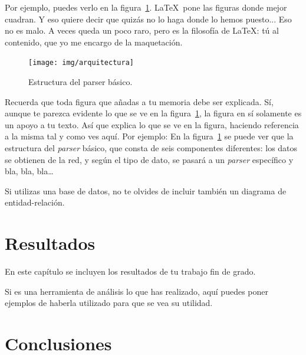 \documentclass[a4paper, 12pt]{book}
\begin{document}
Por ejemplo, puedes verlo en la figura~\ref{fig:arquitectura}.
\LaTeX \ pone las figuras donde mejor cuadran. 
Y eso quiere decir que quizás no lo haga donde lo hemos puesto...
Eso no es malo.
A veces queda un poco raro, pero es la filosofía de \LaTeX: tú al contenido, que yo me encargo de la maquetación.

\begin{figure}
  \centering
  \texttt{[image: img/arquitectura]}
  \caption{Estructura del parser básico.}
  \label{fig:arquitectura}
\end{figure}

Recuerda que toda figura que añadas a tu memoria debe ser explicada.
Sí, aunque te parezca evidente lo que se ve en la figura~\ref{fig:arquitectura}, la figura en sí solamente es un apoyo a tu texto.
Así que explica lo que se ve en la figura, haciendo referencia a la misma tal y como ves aquí.
Por ejemplo: En la figura~\ref{fig:arquitectura} se puede ver que la estructura del \emph{parser} básico, que consta de seis componentes diferentes: los datos se obtienen de la red, y según el tipo de dato, se pasará a un \emph{parser} específico y bla, bla, bla\ldots

Si utilizas una base de datos, no te olvides de incluir también un diagrama de entidad-relación.



\cleardoublepage
\chapter{Resultados}

En este capítulo se incluyen los resultados de tu trabajo fin de grado.

Si es una herramienta de análisis lo que has realizado, aquí puedes poner ejemplos de haberla utilizado para que se vea su utilidad.



\cleardoublepage
\chapter{Conclusiones}
\label{chap:conclusiones}
\end{document}
